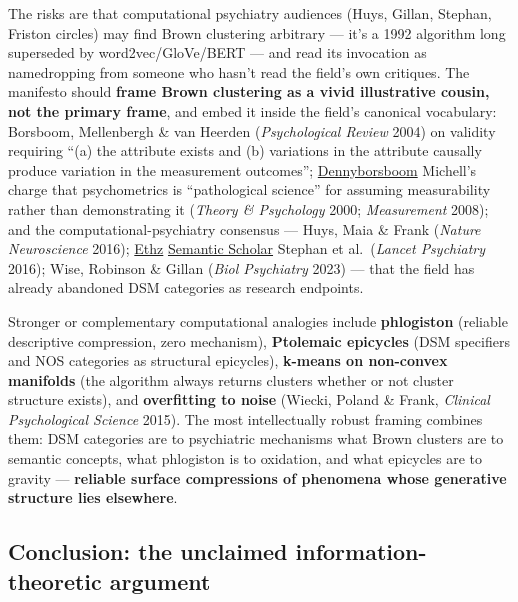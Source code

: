 The risks are that computational psychiatry audiences (Huys, Gillan, Stephan, Friston circles) may find Brown clustering arbitrary --- it's a 1992 algorithm long superseded by word2vec/GloVe/BERT --- and read its invocation as namedropping from someone who hasn't read the field's own critiques. The manifesto should \textbf{frame Brown clustering as a vivid illustrative cousin, not the primary frame}, and embed it inside the field's canonical vocabulary: Borsboom, Mellenbergh \& van Heerden (\emph{Psychological Review} 2004) on validity requiring ``(a) the attribute exists and (b) variations in the attribute causally produce variation in the measurement outcomes''; \href{https://dennyborsboom.com/wp-content/uploads/2017/01/borsboomvalidity2004.pdf}{Dennyborsboom} Michell's charge that psychometrics is ``pathological science'' for assuming measurability rather than demonstrating it (\emph{Theory \& Psychology} 2000; \emph{Measurement} 2008); and the computational-psychiatry consensus --- Huys, Maia \& Frank (\emph{Nature Neuroscience} 2016); \href{https://www.tnu.ethz.ch/fileadmin/user_upload/documents/Publications/2016/2016_Huys_Maia_Frank.pdf}{Ethz} \href{https://www.semanticscholar.org/paper/Computational-psychiatry-as-a-bridge-from-to-Huys-Maia/42abde7800c25b90ec1bb9c88dfbe2ab37e5ae16}{Semantic Scholar} Stephan et al.~(\emph{Lancet Psychiatry} 2016); Wise, Robinson \& Gillan (\emph{Biol Psychiatry} 2023) --- that the field has already abandoned DSM categories as research endpoints.

Stronger or complementary computational analogies include \textbf{phlogiston} (reliable descriptive compression, zero mechanism), \textbf{Ptolemaic epicycles} (DSM specifiers and NOS categories as structural epicycles), \textbf{k-means on non-convex manifolds} (the algorithm always returns clusters whether or not cluster structure exists), and \textbf{overfitting to noise} (Wiecki, Poland \& Frank, \emph{Clinical Psychological Science} 2015). The most intellectually robust framing combines them: DSM categories are to psychiatric mechanisms what Brown clusters are to semantic concepts, what phlogiston is to oxidation, and what epicycles are to gravity --- \textbf{reliable surface compressions of phenomena whose generative structure lies elsewhere}.

\subsection{Conclusion: the unclaimed information-theoretic argument}\label{11_dsm_iii-conclusion-the-unclaimed-information-theoretic-argument}

